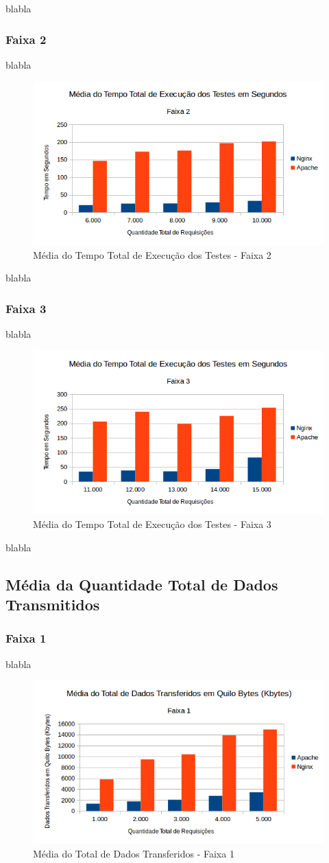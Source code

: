 blabla

\subsubsection{Faixa 2}
blabla

\begin{figure}[H]
	\centering
	\includegraphics[width=0.6\linewidth]{graficos/grafico1-f2} 
	\caption{Média do Tempo Total de Execução dos Testes - Faixa 2}
	\label{fig:grafico1-f2}
\end{figure}
blabla

\subsubsection{Faixa 3}
blabla

\begin{figure}[H]
	\centering
	\includegraphics[width=0.6\linewidth]{graficos/grafico1-f3} 
	\caption{Média do Tempo Total de Execução dos Testes - Faixa 3}
	\label{fig:grafico1-f3}
\end{figure}
blabla


\subsection{Média da Quantidade Total de Dados Transmitidos}
\subsubsection{Faixa 1}

blabla
\begin{figure}[H]
	\centering
	\includegraphics[width=0.6\linewidth]{graficos/grafico2-f1} 
	\caption{Média do Total de Dados Transferidos - Faixa 1}
	\label{fig:grafico2-f1}
\end{figure}

